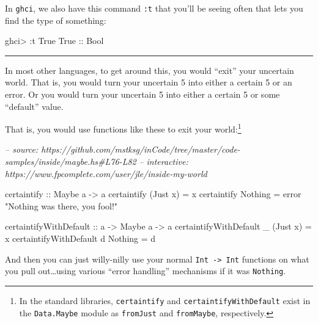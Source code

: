 \documentclass[]{article}
\newenvironment{Shaded}{}{}
\newcommand{\CommentTok}[1]{\textcolor[rgb]{0.38,0.63,0.69}{\textit{#1}}}
\newcommand{\DataTypeTok}[1]{\textcolor[rgb]{0.56,0.13,0.00}{#1}}
\newcommand{\FunctionTok}[1]{\textcolor[rgb]{0.02,0.16,0.49}{#1}}
\newcommand{\NormalTok}[1]{#1}
\newcommand{\OtherTok}[1]{\textcolor[rgb]{0.00,0.44,0.13}{#1}}
\newcommand{\StringTok}[1]{\textcolor[rgb]{0.25,0.44,0.63}{#1}}
\begin{document}
In \texttt{ghci}, we also have this command \texttt{:t} that you'll be seeing
often that lets you find the type of something:

\begin{Shaded}
\begin{Highlighting}[]
\NormalTok{ghci}\FunctionTok{>} \FunctionTok{:}\NormalTok{t }\DataTypeTok{True}
\DataTypeTok{True}\OtherTok{ ::} \DataTypeTok{Bool}
\end{Highlighting}
\end{Shaded}

\begin{center}\rule{0.5\linewidth}{\linethickness}\end{center}

In most other languages, to get around this, you would ``exit'' your uncertain
world. That is, you would turn your uncertain 5 into either a certain 5 or an
error. Or you would turn your uncertain 5 into either a certain 5 or some
``default'' value.

That is, you would use functions like these to exit your world:\footnote{In the
  standard libraries, \texttt{certaintify} and \texttt{certaintifyWithDefault}
  exist in the \texttt{Data.Maybe} module as \texttt{fromJust} and
  \texttt{fromMaybe}, respectively.}

\begin{Shaded}
\begin{Highlighting}[]
\CommentTok{-- source: https://github.com/mstksg/inCode/tree/master/code-samples/inside/maybe.hs#L76-L82}
\CommentTok{-- interactive: https://www.fpcomplete.com/user/jle/inside-my-world}

\OtherTok{certaintify ::} \DataTypeTok{Maybe}\NormalTok{ a }\OtherTok{->}\NormalTok{ a}
\NormalTok{certaintify (}\DataTypeTok{Just}\NormalTok{ x) }\FunctionTok{=}\NormalTok{ x}
\NormalTok{certaintify }\DataTypeTok{Nothing}  \FunctionTok{=}\NormalTok{ error }\StringTok{"Nothing was there, you fool!"}

\OtherTok{certaintifyWithDefault ::}\NormalTok{ a }\OtherTok{->} \DataTypeTok{Maybe}\NormalTok{ a }\OtherTok{->}\NormalTok{ a}
\NormalTok{certaintifyWithDefault _ (}\DataTypeTok{Just}\NormalTok{ x) }\FunctionTok{=}\NormalTok{ x}
\NormalTok{certaintifyWithDefault d }\DataTypeTok{Nothing}  \FunctionTok{=}\NormalTok{ d}
\end{Highlighting}
\end{Shaded}

And then you can just willy-nilly use your normal
\texttt{Int\ -\textgreater{}\ Int} functions on what you pull out\ldots{}using
various ``error handling'' mechanisms if it was \texttt{Nothing}.
\end{document}
